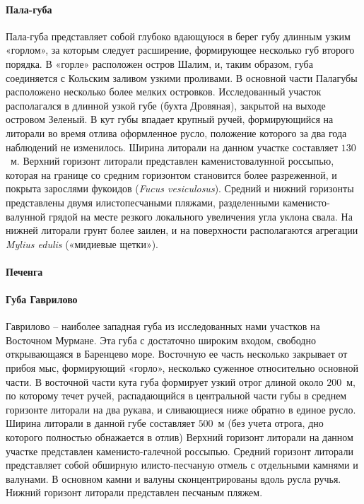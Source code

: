 \documentclass[12pt, a4paper]{disser}
\begin{document}
    \paragraph{Пала-губа}
Пала-губа   представляет   собой   глубоко   вдающуюся   в   берег   губу   длинным   узким «горлом», за которым следует расширение, формирующее несколько губ второго порядка. 
В «горле» расположен остров Шалим, и, таким образом, губа соединяется с Кольским заливом узкими   проливами.   
В   основной   части   Пала­губы   расположено   несколько   более   мелких островков. 
Исследованный участок располагался в длинной узкой губе (бухта Дровяная), закрытой на выходе островом Зеленый.
В кут губы впадает крупный ручей, формирующийся на литорали во время отлива оформленное русло, положение которого за два года наблюдений не изменилось.
Ширина литорали на данном участке составляет  $130$~м. 
Верхний горизонт литорали представлен   каменисто­валунной   россыпью,   которая   на   границе   со   средним   горизонтом становится более разреженной, и покрыта зарослями фукоидов ({\it Fucus vesiculosus}). 
Средний и нижний   горизонты   представлены   двумя   илисто­песчаными   пляжами,   разделенными каменисто­валунной грядой на месте резкого локального увеличения угла уклона свала. 
На нижней литорали грунт более заилен, и на поверхности располагаются агрегации {\it Mylius edulis} («мидиевые щетки»).

    \paragraph{Печенга}

    \paragraph{Губа Гаврилово}
Гаврилово – наиболее западная губа из исследованных нами участков на Восточном Мурмане. 
Эта   губа   с  достаточно   широким   входом,   свободно   открывающаяся  в  Баренцево море.   
Восточную   ее   часть   несколько   закрывает   от   прибоя   мыс,   формирующий   «горло», несколько суженное относительно основной части. 
В восточной части кута губа формирует узкий отрог длиной   около $200$~м, по которому течет ручей, распадающийся в центральной части   губы  в  среднем   горизонте   литорали   на   два   рукава,   и   сливающиеся   ниже   обратно   в единое русло.
Ширина литорали  в  данной губе составляет  $500$~м  (без  учета отрога, дно которого полностью обнажается в отлив) Верхний горизонт литорали на данном участке представлен каменисто-галечной   россыпью.   
Средний   горизонт   литорали   представляет   собой   обширную илисто-песчаную   отмель   с   отдельными   камнями   и   валунами.  
В   основном   камни   и   валуны сконцентрированы   вдоль   русла   ручья.   
Нижний   горизонт   литорали   представлен   песчаным пляжем. 
\end{document}
